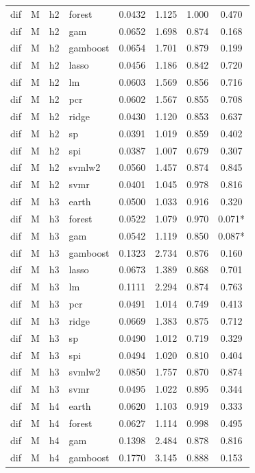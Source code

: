 \begin{ThreePartTable}
\begin{longtable}[t]{llclcccc}
dif & M & h2 & forest & 0.0432 & 1.125 & 1.000 & 0.470\\
dif & M & h2 & gam & 0.0652 & 1.698 & 0.874 & 0.168\\
dif & M & h2 & gamboost & 0.0654 & 1.701 & 0.879 & 0.199\\
dif & M & h2 & lasso & 0.0456 & 1.186 & 0.842 & 0.720\\
dif & M & h2 & lm & 0.0603 & 1.569 & 0.856 & 0.716\\
dif & M & h2 & pcr & 0.0602 & 1.567 & 0.855 & 0.708\\
dif & M & h2 & ridge & 0.0430 & 1.120 & 0.853 & 0.637\\
dif & M & h2 & sp & 0.0391 & 1.019 & 0.859 & 0.402\\
dif & M & h2 & spi & 0.0387 & 1.007 & 0.679 & 0.307\\
dif & M & h2 & svmlw2 & 0.0560 & 1.457 & 0.874 & 0.845\\
dif & M & h2 & svmr & 0.0401 & 1.045 & 0.978 & 0.816\\
\addlinespace
dif & M & h3 & earth & 0.0500 & 1.033 & 0.916 & 0.320\\
dif & M & h3 & forest & 0.0522 & 1.079 & 0.970 & 0.071*\\
dif & M & h3 & gam & 0.0542 & 1.119 & 0.850 & 0.087*\\
dif & M & h3 & gamboost & 0.1323 & 2.734 & 0.876 & 0.160\\
dif & M & h3 & lasso & 0.0673 & 1.389 & 0.868 & 0.701\\
dif & M & h3 & lm & 0.1111 & 2.294 & 0.874 & 0.763\\
dif & M & h3 & pcr & 0.0491 & 1.014 & 0.749 & 0.413\\
dif & M & h3 & ridge & 0.0669 & 1.383 & 0.875 & 0.712\\
dif & M & h3 & sp & 0.0490 & 1.012 & 0.719 & 0.329\\
dif & M & h3 & spi & 0.0494 & 1.020 & 0.810 & 0.404\\
dif & M & h3 & svmlw2 & 0.0850 & 1.757 & 0.870 & 0.874\\
dif & M & h3 & svmr & 0.0495 & 1.022 & 0.895 & 0.344\\
\addlinespace
dif & M & h4 & earth & 0.0620 & 1.103 & 0.919 & 0.333\\
dif & M & h4 & forest & 0.0627 & 1.114 & 0.998 & 0.495\\
dif & M & h4 & gam & 0.1398 & 2.484 & 0.878 & 0.816\\
dif & M & h4 & gamboost & 0.1770 & 3.145 & 0.888 & 0.153\\

\end{longtable}
\end{ThreePartTable}
